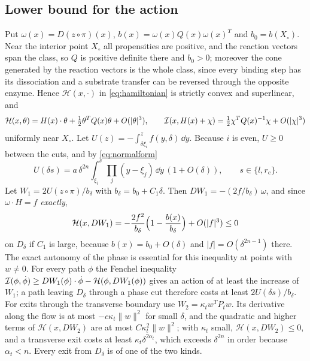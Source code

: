 \subsection{Lower bound for the action}
Put \(\omega(x)=D(z\circ\pi)(x)\), \(b(x)=\omega(x)Q(x)\omega(x)^T\) and
\(b_0=b(X_\circ)\). Near the interior point \(X_\circ\) all propensities are positive, and the
reaction vectors span the class, so \(Q\) is positive definite there and \(b_0>0\); moreover
the cone generated by the reaction vectors is the whole class, since every binding step has
its dissociation and a substrate transfer can be reversed through the opposite enzyme. Hence
\(\mathcal H(x,\cdot)\) in \eqref{eq:hamiltonian} is strictly convex and superlinear, and
\[
 \mathcal H(x,\theta)=H(x)\cdot\theta+\tfrac12\theta^TQ(x)\theta+O(|\theta|^3),\qquad
 \mathcal I(x,H(x)+\chi)=\tfrac12\chi^TQ(x)^{-1}\chi+O(|\chi|^3)
\]
uniformly near \(X_\circ\). Let \(U(z)=-\int_{\delta\xi_i}^zf(y,\delta)\,\dd y\). Because
\(i\) is even, \(U\ge0\) between the cuts, and by \eqref{eq:normalform}
\begin{equation}\label{eq:Ucut}
 U(\delta s)=a\,\delta^{2n}\int_{\xi_i}^{s}\prod_j(y-\xi_j)\,\dd y\,(1+O(\delta)),
 \qquad s\in\{l,r_{\mathrm c}\}.
\end{equation}
Let \(W_1=2U(z\circ\pi)/b_\delta\) with \(b_\delta=b_0+C_1\delta\). Then
\(DW_1=-(2f/b_\delta)\,\omega\), and since \(\omega\cdot H=f\) \emph{exactly},
\[
 \mathcal H(x,DW_1)=-\frac{2f^2}{b_\delta}\Bigl(1-\frac{b(x)}{b_\delta}\Bigr)+O(|f|^3)\le0
\]
on \(D_\delta\) if \(C_1\) is large, because \(b(x)=b_0+O(\delta)\) and
\(|f|=O(\delta^{2n-1})\) there. The exact autonomy of the phase is essential for this
inequality at points with \(w\ne0\). For every path \(\phi\) the Fenchel inequality
\(\mathcal I(\phi,\dot\phi)\ge DW_1(\phi)\cdot\dot\phi-\mathcal H(\phi,DW_1(\phi))\) gives an action
of at least the increase of \(W_1\); a path leaving \(D_\delta\) through a phase cut therefore
costs at least \(2U(\delta s)/b_\delta\). For exits through the transverse boundary use
\(W_2=\kappa_tw^TP_tw\). Its derivative along the flow is at most \(-c\kappa_t\|w\|^2\) for
small \(\delta\), and the quadratic and higher terms of \(\mathcal H(x,DW_2)\) are at most
\(C\kappa_t^2\|w\|^2\); with \(\kappa_t\) small, \(\mathcal H(x,DW_2)\le0\), and a transverse
exit costs at least \(\kappa_t\delta^{2\alpha_t}\), which exceeds \(\delta^{2n}\) in order
because \(\alpha_t<n\). Every exit from \(D_\delta\) is of one of the two kinds.

